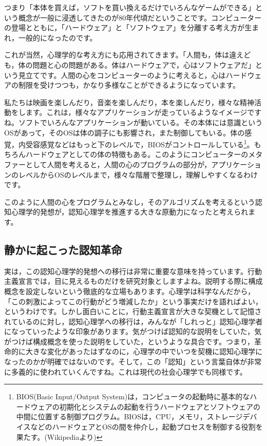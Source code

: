 \documentclass{ltjsbook}
\begin{document}
つまり「本体を買えば，ソフトを買い換えるだけでいろんなゲームができる」という概念が一般に浸透してきたのが80年代頃だということです。コンピューターの登場とともに，「ハードウェア」と「ソフトウェア」を分離する考え方が生まれ，一般的になったのです。

これが当然，心理学的な考え方にも応用されてきます。「人間も，体は違えども，体の問題と心の問題がある。体はハードウェアで，心はソフトウェアだ」という見立てです。人間の心をコンピューターのように考えると，心はハードウェアの制限を受けつつも，かなり多様なことができるようになっています。

私たちは映画を楽しんだり，音楽を楽しんだり，本を楽しんだり，様々な精神活動をします。これは，様々なアプリケーションが走っているようなイメージですね。ソフトでいろんなアプリケーションが動いている。その本体には意識というOSがあって，そのOSは体の調子にも影響され，また制御してもいる。体の感覚，内受容感覚などはもっと下のレベルで，BIOSがコントロールしている\footnote{BIOS(Basic Input/Output System)は，コンピュータの起動時に基本的なハードウェアの初期化とシステムの起動を行うハードウェアとソフトウェアの中間に位置する制御プログラム。BIOSは，CPU，メモリ，ストレージデバイスなどのハードウェアとOSの間を仲介し，起動プロセスを制御する役割を果たす。(Wikipediaより)}。もちろんハードウェアとしての体の特徴もある。このようにコンピューターのメタファーとして人間を考えると，人間の心のプログラムの部分が，アプリケーションのレベルからOSのレベルまで，様々な階層で整理し，理解しやすくなるわけです。

このように人間の心をプログラムとみなし，そのアルゴリズムを考えるという認知心理学的発想が，認知心理学を推進する大きな原動力になったと考えられます。

\subsection{静かに起こった認知革命}

実は，この認知心理学的発想への移行は非常に重要な意味を持っています。行動主義宣言では，目に見えるものだけを研究対象としますよね。説明する際に構成概念を設定しないという徹底的な立場もあります。心理学は科学なんだから，「この刺激によってこの行動がどう増減したか」という事実だけを語ればよい，というわけです。しかし面白いことに，行動主義宣言が大きな契機として記憶されているのに対し，認知心理学への移行は，みんなが「しれっと」認知心理学者になっていったような印象があります。気がつけば認知的な説明をしていた，気がつけば構成概念を使った説明をしていた，というような具合です。つまり，革命的に大きな変化があったはずなのに，心理学の中でいつを契機に認知心理学になったのかが明確ではないのです。そして，この「認知」という言葉自体が非常に多義的に使われていくんですね。これは現代の社会心理学でも同様です。
\end{document}
